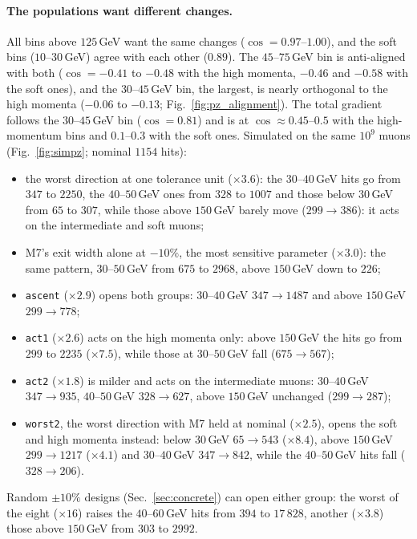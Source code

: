 \documentclass[11pt,a4paper]{article}
\begin{document}
\paragraph{The populations want different changes.}
All bins above $125$\,GeV want the same changes ($\cos=0.97$--$1.00$), and the soft bins
($10$--$30$\,GeV) agree with each other ($0.89$). The $45$--$75$\,GeV bin is anti-aligned with
both ($\cos=-0.41$ to $-0.48$ with the high momenta, $-0.46$ and $-0.58$ with the soft ones), and
the $30$--$45$\,GeV bin, the largest, is nearly orthogonal to the high momenta ($-0.06$ to
$-0.13$; Fig.~\ref{fig:pz_alignment}). The total gradient follows the $30$--$45$\,GeV bin
($\cos=0.81$) and is at $\cos\approx0.45$--$0.5$ with the high-momentum bins and $0.1$--$0.3$ with
the soft ones. Simulated on the same $10^9$ muons (Fig.~\ref{fig:simpz}; nominal $1154$ hits):
\begin{itemize}
  \item the worst direction at one tolerance unit ($\times3.6$): the $30$--$40$\,GeV hits go from
        $347$ to $2250$, the $40$--$50$\,GeV ones from $328$ to $1007$ and those below $30$\,GeV from
        $65$ to $307$, while those above $150$\,GeV barely move ($299\to386$): it acts on the
        intermediate and soft muons;
  \item M7's exit width alone at $-10\%$, the most sensitive parameter ($\times3.0$): the same
        pattern, $30$--$50$\,GeV from $675$ to $2968$, above $150$\,GeV down to $226$;
  \item \texttt{ascent} ($\times2.9$) opens both groups: $30$--$40$\,GeV $347\to1487$ and above
        $150$\,GeV $299\to778$;
  \item \texttt{act1} ($\times2.6$) acts on the high momenta only: above $150$\,GeV the hits go from
        $299$ to $2235$ ($\times7.5$), while those at $30$--$50$\,GeV fall ($675\to567$);
  \item \texttt{act2} ($\times1.8$) is milder and acts on the intermediate muons: $30$--$40$\,GeV
        $347\to935$, $40$--$50$\,GeV $328\to627$, above $150$\,GeV unchanged ($299\to287$);
  \item \texttt{worst2}, the worst direction with M7 held at nominal ($\times2.5$), opens the soft
        and high momenta instead: below $30$\,GeV $65\to543$ ($\times8.4$), above $150$\,GeV
        $299\to1217$ ($\times4.1$) and $30$--$40$\,GeV $347\to842$, while the $40$--$50$\,GeV hits
        fall ($328\to206$).
\end{itemize}
Random $\pm10\%$ designs (Sec.~\ref{sec:concrete}) can open either group: the worst of the eight
($\times16$) raises the $40$--$60$\,GeV hits from $394$ to $17\,828$, another ($\times3.8$) those
above $150$\,GeV from $303$ to $2992$.
\end{document}
